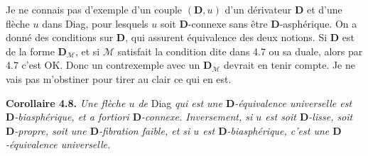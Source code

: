 \documentclass[11pt]{article}
\def\dcprintedpending{}
\newcommand{\msp}[1]{\marginpar{\footnotesize\raggedright
  \ifx\dcprintedpending\empty\else p.~\dcprintedpending\par\fi
  [#1]}\gdef\dcprintedpending{}}
\newcommand{\D}{\mathbf{D}}
\begin{document}
Je ne connais pas d'exemple d'un couple $(\D, u)$ d'un dérivateur $\D$ et d'une flèche $u$ dans Diag, pour lesquels $u$ soit $\D$-connexe sans être $\D$-asphérique. On a donné des conditions sur $\D$, qui assurent équivalence des deux notions. Si $\D$ est de la forme $\D_{\mathcal{M}}$, et si $\mathcal{M}$ satisfait la condition dite dans 4.7 ou sa duale, alors par 4.7 c'est OK. Donc un contrexemple avec un $\D_{\mathcal{M}}$ devrait en tenir compte. Je ne vais pas m'obstiner pour tirer au clair ce qui en est.

\msp{page 65}

\textbf{Corollaire 4.8.} \textit{Une flèche $u$ de} Diag \textit{qui est une $\D$-équivalence universelle est $\D$-biasphérique, et \textup{a fortiori} $\D$-connexe. Inversement, si $u$ est soit $\D$-lisse, soit $\D$-propre, soit une $\D$-fibration faible, et si $u$ est $\D$-biasphérique, c'est une $\D$-équivalence universelle.}
\end{document}
